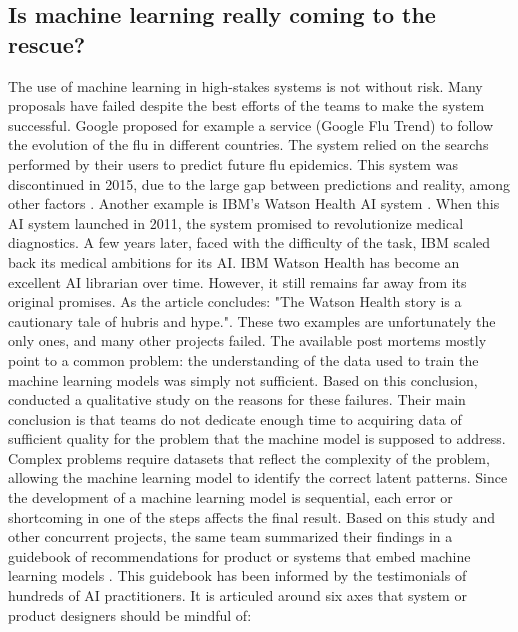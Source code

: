 \subsection{Is machine learning really coming to the rescue?}
The use of machine learning in high-stakes systems is not without risk.
Many proposals have failed despite the best efforts of the teams to make the system successful.
Google proposed for example a service (Google Flu Trend) to follow the evolution of the flu in different countries.
The system relied on the searchs performed by their users to predict future flu epidemics.
This system was discontinued in 2015, due to the large gap between predictions and reality, among other factors \textcite{lazerWhatWeCan2015,kandulaReappraisingUtilityGoogle2019}.
Another example is IBM's Watson Health AI system \parencite{stricklandIBMWatsonHeal2019}.
When this AI system launched in 2011, the system promised to revolutionize medical diagnostics.
A few years later, faced with the difficulty of the task, IBM scaled back its medical ambitions for its AI.
IBM Watson Health has become an excellent AI librarian over time.
However, it still remains far away from its original promises.
As the article concludes: "The Watson Health story is a cautionary tale of hubris and hype.".
These two examples are unfortunately the only ones, and many other projects failed.
The available post mortems mostly point to a common problem: the understanding of the data used to train the machine learning models  was simply not sufficient.
Based on this conclusion, \textcite{sambasivanEveryoneWantsModel2021} conducted a qualitative study on the reasons for these failures.
Their main conclusion is that teams do not dedicate enough time to acquiring data of sufficient quality for the problem that the machine model is supposed to address.
Complex problems require datasets that reflect the complexity of the problem, allowing the machine learning model to identify the correct latent patterns.
Since the development of a machine learning model is sequential, each error or shortcoming in one of the steps affects the final result.
Based on this study and other concurrent projects, the same team summarized their findings in a guidebook of recommendations for product or systems that embed machine learning models \parencite{pairPeopleAIGuidebook2021}.
This guidebook has been informed by the testimonials of hundreds of AI practitioners.
It is articuled around six axes that system or product designers should be mindful of:


